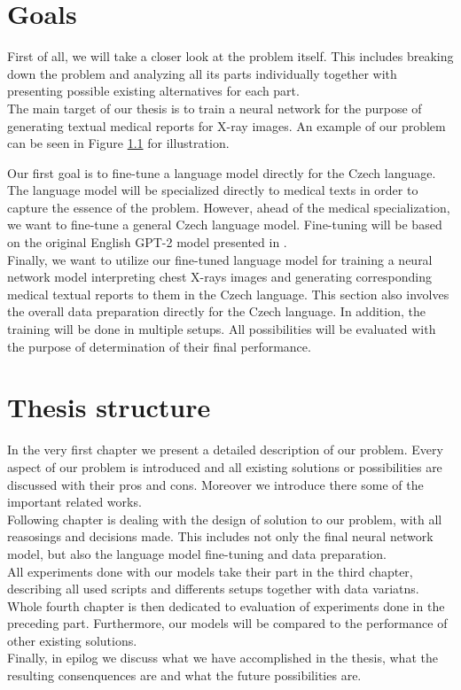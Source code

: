 \section*{Goals}
First of all, we will take a closer look at the problem itself. This includes breaking down the problem and analyzing all its parts individually together with presenting possible existing alternatives for each part. \\

The main target of our thesis is to train a neural network for the purpose of generating textual medical reports for X-ray images. An example of our problem can be seen in Figure \hyperref[fig01:ProblemExample]{1.1} for illustration.\\
\newpage

Our first goal is to fine-tune a language model directly for the Czech language. The language model will be specialized directly to medical texts in order to capture the essence of the problem. However, ahead of the medical specialization, we want to fine-tune a general Czech language model. Fine-tuning will be based on the original English GPT-2 model presented in \citet{radford2019language}.\\

Finally, we want to utilize our fine-tuned language model for training a neural network model interpreting chest X-rays images and generating corresponding medical textual reports to them in the Czech language. This section also involves the overall data preparation directly for the Czech language. In addition, the training will be done in multiple setups. All possibilities will be evaluated with the purpose of determination of their final performance.\\

\section*{Thesis structure}

In the very first chapter we present a detailed description of our problem. Every aspect of our problem is introduced and all existing solutions or possibilities are discussed with their pros and cons. Moreover we introduce there some of the important related works.\\

Following chapter is dealing with the design of solution to our problem, with all reasosings and decisions made. This includes not only the final neural network model, but also the language model fine-tuning and data preparation.\\

All experiments done with our models take their part in the third chapter, describing all used scripts and differents setups together with data variatns.\\

Whole fourth chapter is then dedicated to evaluation of experiments done in the preceding part. Furthermore, our models will be compared to the performance of other existing solutions.\\

Finally, in epilog we discuss what we have accomplished in the thesis, what the resulting consenquences are and what the future possibilities are.